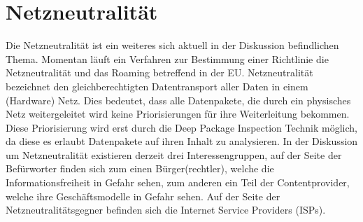 \documentclass[
	12pt,
	a4paper,
	BCOR10mm,
	DIV14,
	listof=totoc,
	bibliography=totoc,
	headsepline
]{scrreprt}
\begin{document}

\section{Netzneutralität}
\label{netneutr}
Die Netzneutralität ist ein weiteres sich aktuell in der Diskussion befindlichen Thema.
Momentan läuft ein Verfahren zur Bestimmung einer Richtlinie die Netzneutralität und das Roaming betreffend in der EU.
Netzneutralität bezeichnet den gleichberechtigten Datentransport aller Daten in einem (Hardware) Netz.
Dies bedeutet, dass alle Datenpakete, die durch ein physisches Netz weitergeleitet wird keine Priorisierungen für ihre Weiterleitung bekommen.
Diese Priorisierung wird erst durch die Deep Package Inspection Technik möglich, da diese es erlaubt Datenpakete auf ihren Inhalt zu analysieren.
In der Diskussion um Netzneutralität existieren derzeit drei Interessengruppen, auf der Seite der Befürworter finden sich zum einen Bürger(rechtler), welche die Informationsfreiheit in Gefahr sehen, zum anderen ein Teil der Contentprovider, welche ihre Geschäftsmodelle in Gefahr sehen.
Auf der Seite der Netzneutralitätsgegner befinden sich die Internet Service Providers (ISPs).
\end{document}
